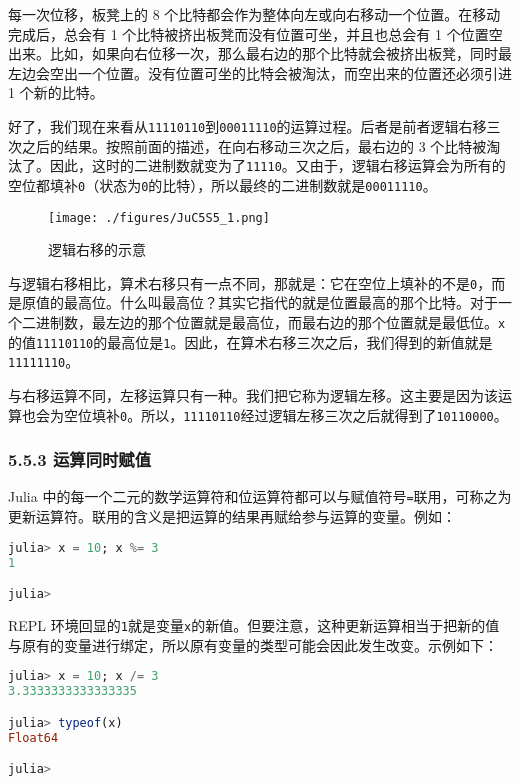 每一次位移，板凳上的 8 个比特都会作为整体向左或向右移动一个位置。在移动完成后，总会有 1 个比特被挤出板凳而没有位置可坐，并且也总会有 1 个位置空出来。比如，如果向右位移一次，那么最右边的那个比特就会被挤出板凳，同时最左边会空出一个位置。没有位置可坐的比特会被淘汰，而空出来的位置还必须引进 1 个新的比特。

好了，我们现在来看从\verb|11110110|到\verb|00011110|的运算过程。后者是前者逻辑右移三次之后的结果。按照前面的描述，在向右移动三次之后，最右边的 3 个比特被淘汰了。因此，这时的二进制数就变为了\verb|11110|。又由于，逻辑右移运算会为所有的空位都填补\verb|0|（状态为\verb|0|的比特），所以最终的二进制数就是\verb|00011110|。
\begin{figure}[ht]
\centering
\texttt{[image: ./figures/JuC5S5\_1.png]}
\caption{逻辑右移的示意} \label{JuC5S5_fig1}
\end{figure}

与逻辑右移相比，算术右移只有一点不同，那就是：它在空位上填补的不是\verb|0|，而是原值的最高位。什么叫最高位？其实它指代的就是位置最高的那个比特。对于一个二进制数，最左边的那个位置就是最高位，而最右边的那个位置就是最低位。\verb|x|的值\verb|11110110|的最高位是\verb|1|。因此，在算术右移三次之后，我们得到的新值就是\verb|11111110|。

与右移运算不同，左移运算只有一种。我们把它称为逻辑左移。这主要是因为该运算也会为空位填补\verb|0|。所以，\verb|11110110|经过逻辑左移三次之后就得到了\verb|10110000|。

\subsubsection{5.5.3 运算同时赋值}

Julia 中的每一个二元的数学运算符和位运算符都可以与赋值符号\verb|=|联用，可称之为更新运算符。联用的含义是把运算的结果再赋给参与运算的变量。例如：
\begin{lstlisting}[language=julia]
julia> x = 10; x %= 3
1

julia>
\end{lstlisting}

REPL 环境回显的\verb|1|就是变量\verb|x|的新值。但要注意，这种更新运算相当于把新的值与原有的变量进行绑定，所以原有变量的类型可能会因此发生改变。示例如下：
\begin{lstlisting}[language=julia]
julia> x = 10; x /= 3
3.3333333333333335

julia> typeof(x)
Float64

julia> 
\end{lstlisting}

